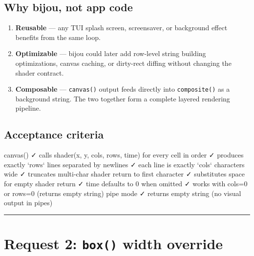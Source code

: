\subsection{Why bijou, not app code}\label{record-016-why-bijou-not-app-code}

\begin{enumerate}
\def\labelenumi{\arabic{enumi}.}
\tightlist
\item
  \textbf{Reusable} --- any TUI splash screen, screensaver, or background effect benefits from the same loop.
\item
  \textbf{Optimizable} --- bijou could later add row-level string building optimizations, canvas caching, or dirty-rect diffing without changing the shader contract.
\item
  \textbf{Composable} --- \texttt{c\allowbreak{}a\allowbreak{}n\allowbreak{}v\allowbreak{}a\allowbreak{}s\allowbreak{}(\allowbreak{})} output feeds directly into \texttt{c\allowbreak{}o\allowbreak{}m\allowbreak{}p\allowbreak{}o\allowbreak{}s\allowbreak{}i\allowbreak{}t\allowbreak{}e\allowbreak{}(\allowbreak{})} as a background string. The two together form a complete layered rendering pipeline.
\end{enumerate}

\subsection{Acceptance criteria}\label{record-016-acceptance-criteria}

\begin{CodeBlock}
canvas()
  ✓ calls shader(x, y, cols, rows, time) for every cell in order
  ✓ produces exactly `rows` lines separated by newlines
  ✓ each line is exactly `cols` characters wide
  ✓ truncates multi-char shader return to first character
  ✓ substitutes space for empty shader return
  ✓ time defaults to 0 when omitted
  ✓ works with cols=0 or rows=0 (returns empty string)
  pipe mode
    ✓ returns empty string (no visual output in pipes)
\end{CodeBlock}

\begin{center}\rule{0.5\linewidth}{0.5pt}\end{center}

\section{\texorpdfstring{Request 2: \texttt{b\allowbreak{}o\allowbreak{}x\allowbreak{}(\allowbreak{})} width override}{Request 2:  width override}}\label{record-016-request-2-box-width-override}

